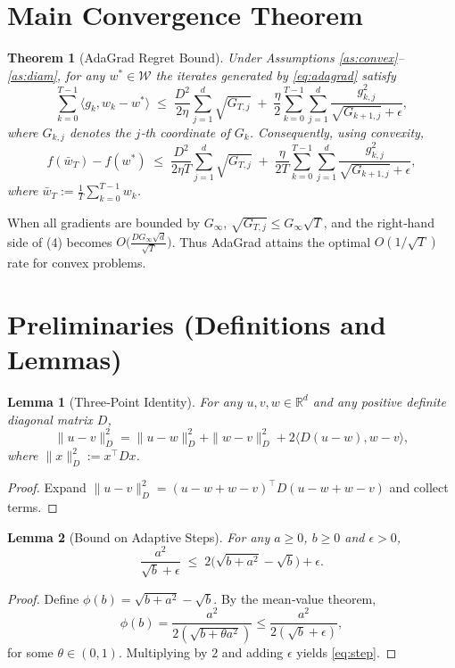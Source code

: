 \documentclass{article}
\newtheorem{theorem}{Theorem}
\newtheorem{lemma}{Lemma}
\newcommand{\RR}{\mathbb{R}}
\newcommand{\inner}[2]{\langle #1,#2\rangle}
\begin{document}
\section*{Main Convergence Theorem}
\begin{theorem}[AdaGrad Regret Bound]\label{thm:regret}
Under Assumptions \ref{as:convex}--\ref{as:diam}, for any $w^{*}\in\mathcal{W}$ the iterates generated by \eqref{eq:adagrad} satisfy
\[
\sum_{k=0}^{T-1}\inner{g_{k}}{w_{k}-w^{*}}
\;\le\;
\frac{D^{2}}{2\eta}\sum_{j=1}^{d}\sqrt{G_{T,j}}
\;+\;
\frac{\eta}{2}\sum_{k=0}^{T-1}\sum_{j=1}^{d}\frac{g_{k,j}^{2}}{\sqrt{G_{k+1,j}}+\epsilon},
\tag{3}
\]
where $G_{k,j}$ denotes the $j$‑th coordinate of $G_{k}$. Consequently, using convexity,
\[
f(\bar w_{T})-f(w^{*})\;\le\;
\frac{D^{2}}{2\eta T}\sum_{j=1}^{d}\sqrt{G_{T,j}}
\;+\;
\frac{\eta}{2T}\sum_{k=0}^{T-1}\sum_{j=1}^{d}\frac{g_{k,j}^{2}}{\sqrt{G_{k+1,j}}+\epsilon},
\tag{4}
\]
where $\bar w_{T}:=\frac1T\sum_{k=0}^{T-1}w_{k}$.
\end{theorem}
When all gradients are bounded by $G_{\infty}$, $\sqrt{G_{T,j}}\le G_{\infty}\sqrt{T}$, and the right‑hand side of (4) becomes $O\!\bigl(\frac{DG_{\infty}\sqrt{d}}{\sqrt{T}}\bigr)$. Thus AdaGrad attains the optimal $O(1/\sqrt{T})$ rate for convex problems.

\section*{Preliminaries (Definitions and Lemmas)}
\begin{lemma}[Three‑Point Identity]\label{lem:three}
For any $u,v,w\in\RR^{d}$ and any positive definite diagonal matrix $D$,
\[
\|u-v\|_{D}^{2}
= \|u-w\|_{D}^{2}+\|w-v\|_{D}^{2}
+2\inner{D(u-w)}{w-v},
\]
where $\|x\|_{D}^{2}:=x^{\top}Dx$.
\end{lemma}
\begin{proof}
Expand $\|u-v\|_{D}^{2}= (u-w+w-v)^{\top}D(u-w+w-v)$ and collect terms. \qedhere
\end{proof}

\begin{lemma}[Bound on Adaptive Steps]\label{lem:step}
For any $a\ge0$, $b\ge0$ and $\epsilon>0$,
\[
\frac{a^{2}}{\sqrt{b}+ \epsilon}\;\le\;2\bigl(\sqrt{b+a^{2}}-\sqrt{b}\bigr)+\epsilon .
\tag{5}
\]
\end{lemma}
\begin{proof}
Define $\phi(b)=\sqrt{b+a^{2}}-\sqrt{b}$. By the mean‑value theorem,
\[
\phi(b)=\frac{a^{2}}{2(\sqrt{b+\theta a^{2}})}\le\frac{a^{2}}{2(\sqrt{b}+\epsilon)},
\]
for some $\theta\in(0,1)$. Multiplying by $2$ and adding $\epsilon$ yields \eqref{eq:step}. \qedhere
\end{proof}
\end{document}
